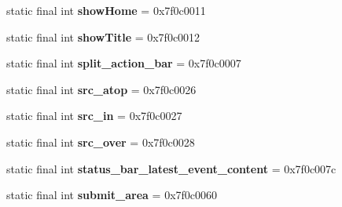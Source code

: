 \begin{DoxyCompactItemize}
\item 
\hypertarget{classandroid_1_1support_1_1v7_1_1appcompat_1_1_r_1_1id_a74b639f9da8bc4d3a6eeecd6489789a1}{}static final int {\bfseries show\+Home} = 0x7f0c0011\label{classandroid_1_1support_1_1v7_1_1appcompat_1_1_r_1_1id_a74b639f9da8bc4d3a6eeecd6489789a1}

\item 
\hypertarget{classandroid_1_1support_1_1v7_1_1appcompat_1_1_r_1_1id_ada18eef9f40701daecab7f1335d38dfd}{}static final int {\bfseries show\+Title} = 0x7f0c0012\label{classandroid_1_1support_1_1v7_1_1appcompat_1_1_r_1_1id_ada18eef9f40701daecab7f1335d38dfd}

\item 
\hypertarget{classandroid_1_1support_1_1v7_1_1appcompat_1_1_r_1_1id_a741149a72fc9b9aaf02b0346115459e2}{}static final int {\bfseries split\+\_\+action\+\_\+bar} = 0x7f0c0007\label{classandroid_1_1support_1_1v7_1_1appcompat_1_1_r_1_1id_a741149a72fc9b9aaf02b0346115459e2}

\item 
\hypertarget{classandroid_1_1support_1_1v7_1_1appcompat_1_1_r_1_1id_ab3834f6ee23ff8baa7614ca68366bf1f}{}static final int {\bfseries src\+\_\+atop} = 0x7f0c0026\label{classandroid_1_1support_1_1v7_1_1appcompat_1_1_r_1_1id_ab3834f6ee23ff8baa7614ca68366bf1f}

\item 
\hypertarget{classandroid_1_1support_1_1v7_1_1appcompat_1_1_r_1_1id_a0302dbca2cbbbe0e6d36f6332939c370}{}static final int {\bfseries src\+\_\+in} = 0x7f0c0027\label{classandroid_1_1support_1_1v7_1_1appcompat_1_1_r_1_1id_a0302dbca2cbbbe0e6d36f6332939c370}

\item 
\hypertarget{classandroid_1_1support_1_1v7_1_1appcompat_1_1_r_1_1id_a8e4a43230fb4b6e5ccb4a6d151bfab22}{}static final int {\bfseries src\+\_\+over} = 0x7f0c0028\label{classandroid_1_1support_1_1v7_1_1appcompat_1_1_r_1_1id_a8e4a43230fb4b6e5ccb4a6d151bfab22}

\item 
\hypertarget{classandroid_1_1support_1_1v7_1_1appcompat_1_1_r_1_1id_a28d5a0cf4e27984507bcda1c338b40a1}{}static final int {\bfseries status\+\_\+bar\+\_\+latest\+\_\+event\+\_\+content} = 0x7f0c007c\label{classandroid_1_1support_1_1v7_1_1appcompat_1_1_r_1_1id_a28d5a0cf4e27984507bcda1c338b40a1}

\item 
\hypertarget{classandroid_1_1support_1_1v7_1_1appcompat_1_1_r_1_1id_a3ba0b5cb29db70be085cc78170b1020e}{}static final int {\bfseries submit\+\_\+area} = 0x7f0c0060\label{classandroid_1_1support_1_1v7_1_1appcompat_1_1_r_1_1id_a3ba0b5cb29db70be085cc78170b1020e}


\end{DoxyCompactItemize}

